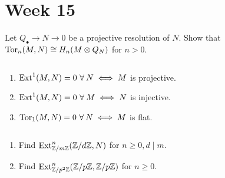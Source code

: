 
\section{Week 15}

\begin{exercise}
  Let $Q_\bullet \to N \to 0$ be a projective resolution of $N$. 
  Show that $\operatorname{Tor}_n(M, N) \cong H_n(M \otimes Q_N)$ for $n > 0$.
\end{exercise}

\begin{exercise}
  $\ $
  \begin{enumerate}
    \item $\Ext^1(M, N) = 0\ \forall N \iff M$ is projective.
    \item $\Ext^1(M, N) = 0\ \forall M \iff N$ is injective.
    \item $\Tor_1(M, N) = 0\ \forall N \iff M$ is flat.
  \end{enumerate}
\end{exercise}

\begin{exercise}
  $\ $
  \begin{enumerate}
    \item Find $\operatorname{Ext}_{\mathbb{Z}/m\mathbb{Z}}^n (\mathbb{Z}/d\mathbb{Z}, N)$ for $n \geq 0, d \mid m$.
    \item Find $\operatorname{Ext}_{\mathbb{Z}/p^2\mathbb{Z}}^n (\mathbb{Z}/p\mathbb{Z}, \mathbb{Z}/p\mathbb{Z})$ for $n \geq 0$.
  \end{enumerate}
\end{exercise}
